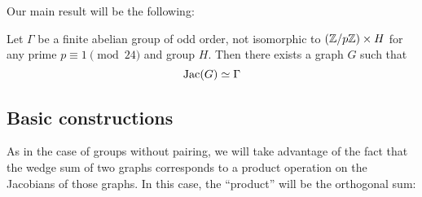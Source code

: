 \documentclass{amsart}
\begin{document}
Our main result will be the following:

\begin{thm}
  \label{thm:graph_pairing}
  Let $\Gamma$ be a finite abelian group of odd order, not isomorphic
  to $(\mathbb{Z}/p\mathbb{Z}) \times H$ for any prime $p \equiv 1 \pmod {24}$ and
  group $H$. Then there exists a graph $G$ such that
  \[
  \operatorname{Jac}(G) \simeq \Gamma
  \]
\end{thm}

\subsection{Basic constructions}

As in the case of groups without pairing, we will take advantage of
the fact that the wedge sum of two graphs corresponds to a product
operation on the Jacobians of those graphs. In this case, the
``product'' will be the orthogonal sum:
\end{document}

